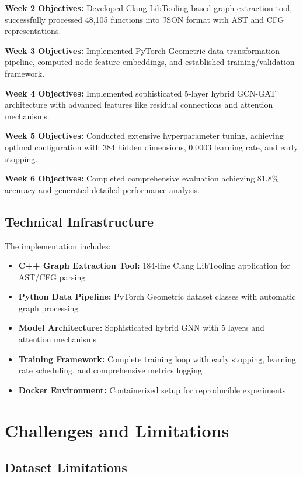 \textbf{Week 2 Objectives:}  Developed Clang LibTooling-based graph extraction tool, successfully processed 48,105 functions into JSON format with AST and CFG representations.

\textbf{Week 3 Objectives:}  Implemented PyTorch Geometric data transformation pipeline, computed node feature embeddings, and established training/validation framework.

\textbf{Week 4 Objectives:}  Implemented sophisticated 5-layer hybrid GCN-GAT architecture with advanced features like residual connections and attention mechanisms.

\textbf{Week 5 Objectives:}  Conducted extensive hyperparameter tuning, achieving optimal configuration with 384 hidden dimensions, 0.0003 learning rate, and early stopping.

\textbf{Week 6 Objectives:}  Completed comprehensive evaluation achieving 81.8\% accuracy and generated detailed performance analysis.

\subsection{Technical Infrastructure}

The implementation includes:
\begin{itemize}
\item \textbf{C++ Graph Extraction Tool:} 184-line Clang LibTooling application for AST/CFG parsing
\item \textbf{Python Data Pipeline:} PyTorch Geometric dataset classes with automatic graph processing  
\item \textbf{Model Architecture:} Sophisticated hybrid GNN with 5 layers and attention mechanisms
\item \textbf{Training Framework:} Complete training loop with early stopping, learning rate scheduling, and comprehensive metrics logging
\item \textbf{Docker Environment:} Containerized setup for reproducible experiments
\end{itemize}

\section{Challenges and Limitations}

\subsection{Dataset Limitations}

